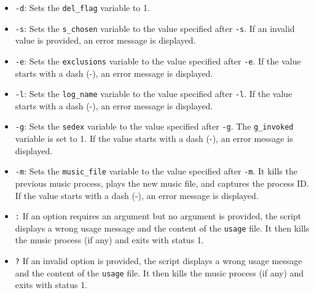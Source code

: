\documentclass[12pt]{article}
\begin{document}
    \begin{itemize}
        \item \texttt{-d}: Sets the \texttt{del\_flag} variable to 1.
        \item \texttt{-s}: Sets the \texttt{s\_chosen} variable to the value specified after \texttt{-s}. If an invalid value is provided, an error message is displayed.
        \item \texttt{-e}: Sets the \texttt{exclusions} variable to the value specified after \texttt{-e}. If the value starts with a dash (-), an error message is displayed.
        \item \texttt{-l}: Sets the \texttt{log\_name} variable to the value specified after \texttt{-l}. If the value starts with a dash (-), an error message is displayed.
        \item \texttt{-g}: Sets the \texttt{sedex} variable to the value specified after \texttt{-g}. The \texttt{g\_invoked} variable is set to 1. If the value starts with a dash (-), an error message is displayed.
        \item \texttt{-m}: Sets the \texttt{music\_file} variable to the value specified after \texttt{-m}. It kills the previous music process, plays the new music file, and captures the process ID. If the value starts with a dash (-), an error message is displayed.
        \item \texttt{:} If an option requires an argument but no argument is provided, the script displays a wrong usage message and the content of the \texttt{usage} file. It then kills the music process (if any) and exits with status 1.
        \item \texttt{?} If an invalid option is provided, the script displays a wrong usage message and the content of the \texttt{usage} file. It then kills the music process (if any) and exits with status 1.
    \end{itemize}
\end{document}
